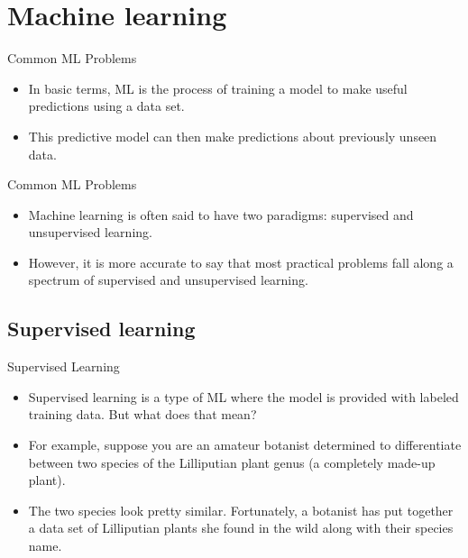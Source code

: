 \documentclass{beamer}
\begin{document}
%
%
%

\section{Machine learning}

\begin{frame}{Common ML Problems}

\begin{itemize}

\item In basic terms, ML is the process of training a model to make useful predictions using a data set. 

\item This predictive model can then make predictions about previously unseen data. 
\end{itemize}

\end{frame}


\begin{frame}{Common ML Problems}

\begin{itemize}

\item Machine learning is often said to have two paradigms: supervised and unsupervised learning. 

\item However, it is more accurate to say that most practical problems fall along a spectrum of supervised and unsupervised learning.
\end{itemize}

\end{frame}



\subsection{Supervised learning}

\begin{frame}{Supervised Learning}

\begin{itemize}
\item Supervised learning is a type of ML where the model is provided with labeled training data. But what does that mean?

\item For example, suppose you are an amateur botanist determined to differentiate between two species of the Lilliputian plant genus (a completely made-up plant). 

\item The two species look pretty similar. Fortunately, a botanist has put together a data set of Lilliputian plants she found in the wild along with their species name.
\end{itemize}

\end{frame}
\end{document}
